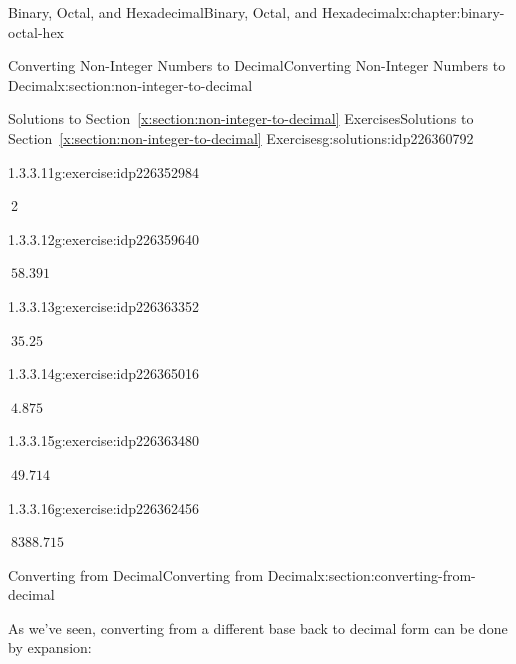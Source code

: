 \documentclass[twoside,10pt,]{book}
\newcommand{\xreffont}{\relax}
\numberwithin{equation}{section}
\begin{document}
\begin{chapterptx}{Binary, Octal, and Hexadecimal}{}{Binary, Octal, and Hexadecimal}{}{}{x:chapter:binary-octal-hex}
\begin{sectionptx}{Converting Non-Integer Numbers to Decimal}{}{Converting Non-Integer Numbers to Decimal}{}{}{x:section:non-integer-to-decimal}
\begin{solutions-subsection}{Solutions to Section~{\xreffont\ref*{x:section:non-integer-to-decimal}} Exercises}{}{Solutions to Section~{\xreffont\ref*{x:section:non-integer-to-decimal}} Exercises}{}{}{g:solutions:idp226360792}
\begin{exercisegroup}
\begin{divisionsolutioneg}{1.3.3.11}{}{g:exercise:idp226352984}%
\par\smallskip%
\noindent\hypertarget{g:solution:idp226353624-main}{}\(\ \)2\end{divisionsolutioneg}%
\end{exercisegroup}
\par\medskip\noindent
\begin{exercisegroup}
\begin{divisionsolutioneg}{1.3.3.12}{}{g:exercise:idp226359640}%
\par\smallskip%
\noindent\hypertarget{g:solution:idp226365144-main}{}\(\ 58.391\)\end{divisionsolutioneg}%
\begin{divisionsolutioneg}{1.3.3.13}{}{g:exercise:idp226363352}%
\par\smallskip%
\noindent\hypertarget{g:solution:idp226362840-main}{}\(\ 35.25\)\end{divisionsolutioneg}%
\begin{divisionsolutioneg}{1.3.3.14}{}{g:exercise:idp226365016}%
\par\smallskip%
\noindent\hypertarget{g:solution:idp226360024-main}{}\(\ 4.875\)\end{divisionsolutioneg}%
\begin{divisionsolutioneg}{1.3.3.15}{}{g:exercise:idp226363480}%
\par\smallskip%
\noindent\hypertarget{g:solution:idp226364632-main}{}\(\ 49.714\)\end{divisionsolutioneg}%
\begin{divisionsolutioneg}{1.3.3.16}{}{g:exercise:idp226362456}%
\par\smallskip%
\noindent\hypertarget{g:solution:idp226365656-main}{}\(\ 8388.715\)\end{divisionsolutioneg}%
\end{exercisegroup}
\par\medskip\noindent
\end{solutions-subsection}
\end{sectionptx}
%
%
\typeout{************************************************}
\typeout{************************************************}
%
\begin{sectionptx}{Converting from Decimal}{}{Converting from Decimal}{}{}{x:section:converting-from-decimal}
\begin{introduction}{}%
As we've seen, converting from a different base back to decimal form can be done by expansion:%

\end{introduction}
\end{sectionptx}
\end{chapterptx}
\end{document}
